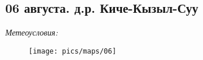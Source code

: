 \subsection{06 августа. д.р. Киче-Кызыл-Суу}
\textit{Метеоусловия: }

\begin{figure}[h!]
	\centering
	\texttt{[image: pics/maps/06]}
	\label{fig:06}
\end{figure}



\clearpage